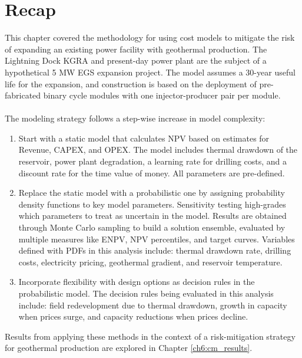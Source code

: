 \section{Recap} \label{ch4:recap}
This chapter covered the methodology for using cost models to mitigate the risk of expanding an existing power facility with geothermal production. The Lightning Dock KGRA and present-day power plant are the subject of a hypothetical 5 MW EGS expansion project. The model assumes a 30-year useful life for the expansion, and construction is based on the deployment of pre-fabricated binary cycle modules with one injector-producer pair per module.
\\
\\
The modeling strategy follows a step-wise increase in model complexity:
\begin{enumerate}
    \item Start with a static model that calculates NPV based on estimates for Revenue, CAPEX, and OPEX. The model includes thermal drawdown of the reservoir, power plant degradation, a learning rate for drilling costs, and a discount rate for the time value of money. All parameters are pre-defined.
    \item Replace the static model with a probabilistic one by assigning probability density functions to key model parameters. Sensitivity testing high-grades which parameters to treat as uncertain in the model. Results are obtained through Monte Carlo sampling to build a solution ensemble, evaluated by multiple measures like ENPV, NPV percentiles, and target curves. Variables defined with PDFs in this analysis include: thermal drawdown rate, drilling costs, electricity pricing, geothermal gradient, and reservoir temperature.
    \item Incorporate flexibility with design options as decision rules in the probabilistic model. The decision rules being evaluated in this analysis include: field redevelopment due to thermal drawdown, growth in capacity when prices surge, and capacity reductions when prices decline.
\end{enumerate}

Results from applying these methods in the context of a risk-mitigation strategy for geothermal production are explored in Chapter \ref{ch6:cm_results}. 